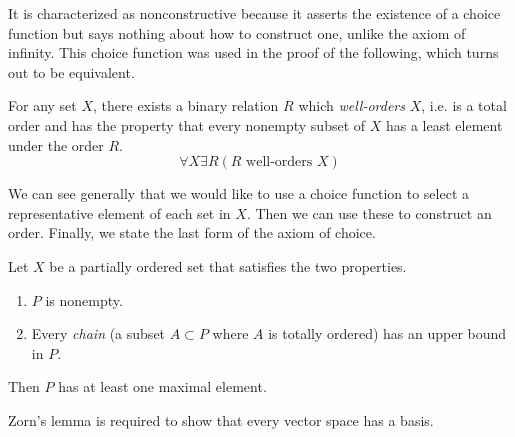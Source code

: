   It is characterized as nonconstructive because it asserts the existence of a choice function but says nothing about how to construct one, unlike the axiom of infinity. This choice function was used in the proof of the following, which turns out to be equivalent.  

  \begin{axiom}
    For any set $X$, there exists a binary relation $R$ which \textit{well-orders} $X$, i.e. is a total order and has the property that every nonempty subset of $X$ has a least element under the order $R$. 
    \begin{equation}
      \forall X \exists R (R \text{ well-orders } X)
    \end{equation}
  \end{axiom}

  We can see generally that we would like to use a choice function to select a representative element of each set in $X$. Then we can use these to construct an order. Finally, we state the last form of the axiom of choice. 

  \begin{axiom}
    Let $X$ be a partially ordered set that satisfies the two properties. 
    \begin{enumerate}
      \item $P$ is nonempty. 
      \item Every \textit{chain} (a subset $A \subset P$ where $A$ is totally ordered) has an upper bound in $P$. 
    \end{enumerate}
    Then $P$ has at least one maximal element. 
  \end{axiom}

  Zorn's lemma is required to show that every vector space has a basis. 

